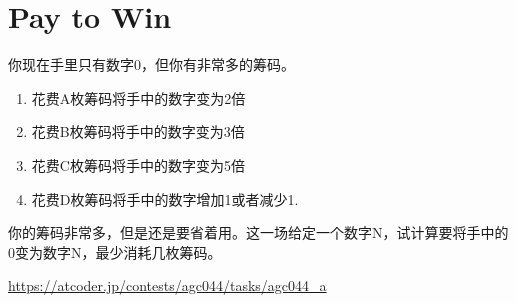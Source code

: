 \section{Pay to Win}
你现在手里只有数字0，但你有非常多的筹码。

\begin{enumerate}
    \item 花费A枚筹码将手中的数字变为2倍
    \item 花费B枚筹码将手中的数字变为3倍
    \item 花费C枚筹码将手中的数字变为5倍
    \item 花费D枚筹码将手中的数字增加1或者减少1.
\end{enumerate}

你的筹码非常多，但是还是要省着用。这一场给定一个数字N，试计算要将手中的0变为数字N，最少消耗几枚筹码。

\url{https://atcoder.jp/contests/agc044/tasks/agc044_a}

